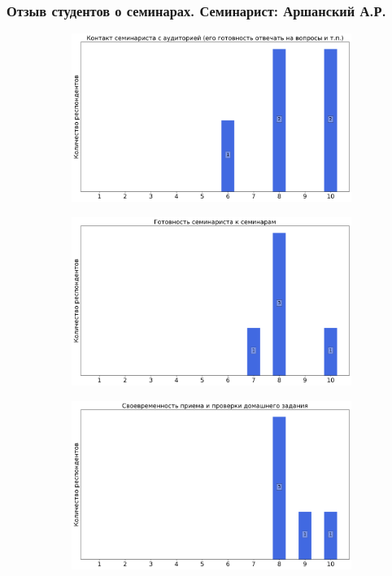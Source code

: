     \subsubsection{Отзыв студентов о семинарах. Семинарист: Аршанский А.Р.}
		\begin{figure}[H]
			\centering
			\begin{subfigure}[b]{0.45\textwidth}
				\centering
				\includegraphics[width=\textwidth]{images/4 course/Защита информации/seminarists-marks-Аршанский А.Р.-0.png}
			\end{subfigure}
			\begin{subfigure}[b]{0.45\textwidth}
				\centering
				\includegraphics[width=\textwidth]{images/4 course/Защита информации/seminarists-marks-Аршанский А.Р.-1.png}
			\end{subfigure}
			\begin{subfigure}[b]{0.45\textwidth}
				\centering
				\includegraphics[width=\textwidth]{images/4 course/Защита информации/seminarists-marks-Аршанский А.Р.-2.png}

\end{subfigure}
\end{figure}
